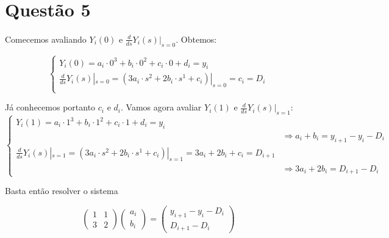 \section*{Questão 5}

\paragraph{}Comecemos avaliando $Y_i(0)$ e $\frac{d}{ds}Y_i(s)|_{s = 0}$. Obtemos:

\begin{equation}
	\left\lbrace\begin{array}{l}
	Y_i(0) = a_i \cdot 0 ^3 + b_i \cdot 0^2 
				+ c_i \cdot 0 + d_i = y_i \\
	\frac{d}{ds}Y_i(s)|_{s = 0} = \left( 3a_i \cdot s^2 + 2b_i \cdot s^1 
				+ c_i \right)|_{s = 0} = c_i  = D_i \\
	\end{array}\right.
\end{equation}

Já conhecemos portanto $c_i$ e $d_i$. Vamos agora avaliar
$Y_i(1)$ e $\frac{d}{ds}Y_i(s)|_{s = 1}$:
\begin{equation}
	\left\lbrace\begin{array}{ll}
	Y_i(1) = a_i \cdot 1 ^3 + b_i \cdot 1^2 
				+ c_i \cdot 1 + d_i = y_i &\\
		&\Rightarrow a_i + b_i = y_{i+1} - y_{i} - D_i \\  
	\frac{d}{ds}Y_i(s)|_{s = 1} = \left( 3a_i \cdot s^2 + 2b_i \cdot s^1 
				+ c_i \right)|_{s = 1} = 3a_i + 2b_i + c_i  = D_{i+1} \\
	& \Rightarrow 3a_i + 2b_i = D_{i+1} - D_{i}
	\end{array}\right.
\end{equation}

Basta então resolver o sistema

\begin{equation}
	\left( 
	\begin{array}{ll}
	  1 & 1 \\
	  3 & 2
	\end{array}		
	\right)	
	\left(
	\begin{array}{l}
	  a_i  \\
	  b_i 
	\end{array}		
	\right)
	=
	\left(
	\begin{array}{l}
	 y_{i+1} - y_{i} - D_i   \\
	  D_{i+1} - D_{i} 
	\end{array}		
	\right)
\end{equation}

